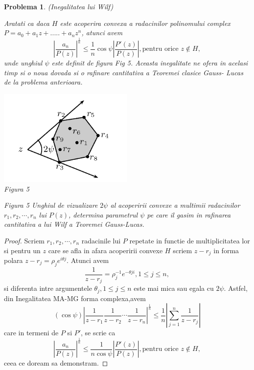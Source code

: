 \documentclass[a4paper,12pt,oneside]{report}
\newtheorem{problem}{Problema}
\begin{document}
\begin{problem} (Inegalitatea lui Wilf)

Aratati ca daca \(H\) este acoperira convexa a radacinilor polinomului complex \(P = a_{0} + a_{1}z + ..... +a_{n}z^{n}\), atunci avem
\begin{displaymath}
  \left | \frac{a_{n}}{P\left ( z \right )} \right |^{\frac{1}{n}}\leq \frac{1}n\cos{\psi }\left | \frac{{P}'\left ( z \right )}{P\left ( z \right )} \right | , \text{pentru orice } z\notin H, \label{eq:2.16} \tag{2.16}
\end{displaymath}
unde unghiul \(\psi\) este definit de figura Fig 5. Aceasta inegalitate ne ofera in acelasi timp si o noua dovada si o rafinare cantitativa  a Teoremei clasice Gauss- Lucas de la problema anterioara.
\begin{center}
	\includegraphics[width=0.5\textwidth]{fig_pb14.png}
	\\ Figura 5
\end{center}
Figura 5  Unghiul de vizualizare \(2\psi\) al acoperirii convexe a multimii radacinilor \(r_{1} , r_{2} , \cdots, r_{n}\)  lui \(P\left ( z \right )\), determina parametrul \(\psi\) pe care il gasim in rafinarea cantitativa a lui Wilf a Teoremei Gauss-Lucas.
\end{problem}
\begin{proof}
Scriem \(r_{1} , r_{2} ,\cdots,r_{n}\) radacinile lui \(P\) repetate in functie de multiplicitatea lor si pentru un \(z\) care se afla in afara acoperirii convexe \(H\) scriem \(z - r_{j}\) in forma polara \(z - r_{j} = \rho _{j}e^{i\theta j}\). Atunci avem
\begin{displaymath}
  \frac{1}{z - r_{j}} = \rho _{j}^{-1}e^{-\theta ji} , 1 \leq  j \leq  n,
\end{displaymath}
si diferenta intre argumentele \(\theta _{j}, 1 \leq j\leq n\) este mai mica sau egala cu \(2\psi\). Astfel, din Inegalitatea  MA-MG forma complexa,avem
\begin{displaymath}
  \left ( \cos\psi  \right )\left | \frac{1}{z - r_{1}} \frac{1}{z - r_{2}}\cdots \frac{1}{z - r_{n}} \right|^{\frac{1}{n}} \leq  \frac{1}{n} \left | \sum_{j = 1}^{n}\frac{1}{z - r_{j}} \right |
\end{displaymath}
care in termeni de \(P\) si \({P}'\), se scrie ca
\begin{displaymath}
   \left | \frac{a_{n}}{P\left ( z \right )} \right |^{\frac{1}{n}}\leq \frac{1}{n\cos\psi }\left | \frac{{P}'\left ( z \right )}{P\left ( z \right )} \right |,  \text{pentru orice }z \notin H,
\end{displaymath}
 ceea ce doream sa demonstram.
\end{proof}
\end{document}
